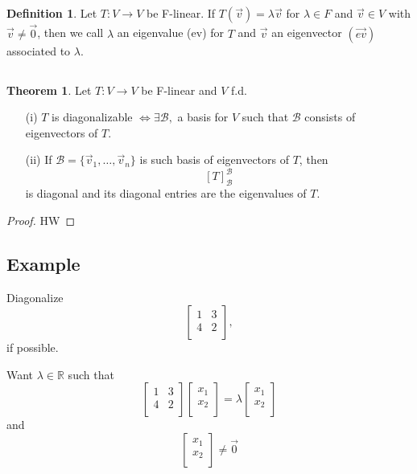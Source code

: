 \documentclass[a4paper,10pt]{article}
\theoremstyle{definition}
\newtheorem{theorem}{Theorem}[section]
\newtheorem{definition}{Definition}[section]
\begin{document}
\subsection{}
\begin{definition}
	Let $T : V \to V$  be F-linear. If $T(\vec{v}) = \lambda \vec{v}$ for
	$\lambda \in F$ and $\vec{v} \in V$ with $\vec{v} \neq \vec{0}$, then we
	call $\lambda$ an eigenvalue (ev) for $T$ and $\vec{v}$ an eigenvector
	$(\vec{ev})$ associated to $\lambda$.
\end{definition}

\subsection{}
\begin{theorem}
	Let $T: V \to V$ be F-linear and $V$ f.d. 
	\begin{enumerate}
		\item[(i)] $T$ is diagonalizable $\iff \exists \mathcal{B},$ a basis for
			$V$ such that $\mathcal{B}$ consists of eigenvectors of $T$.
		\item[(ii)]	If $\mathcal{B} = 	\{ \vec{v}_1, \ldots, \vec{v}_n \}$ is
			such basis of eigenvectors of $T$, then
			$$[T]_\mathcal{B}^\mathcal{B}$$
			is diagonal and its diagonal entries are the eigenvalues of $T$.
	\end{enumerate}
\end{theorem}
\begin{proof}
	HW
\end{proof}



\subsection{Example}

Diagonalize 
$$
\begin{bmatrix}
	1 & 3 \\
	4 & 2 \\
\end{bmatrix}
,
$$
if possible.

Want $\lambda \in \mathbb{R}$ such that
$$
\begin{bmatrix}
	1 & 3 \\
	4 & 2 \\
\end{bmatrix}
\begin{bmatrix}
	x_1 \\
	x_2 \\
\end{bmatrix}
=
\lambda
\begin{bmatrix}
	x_1 \\
	x_2 \\
\end{bmatrix}
$$
and
$$
\begin{bmatrix}
	x_1 \\
	x_2 \\
\end{bmatrix}
\neq
\vec{0}
$$
\end{document}
